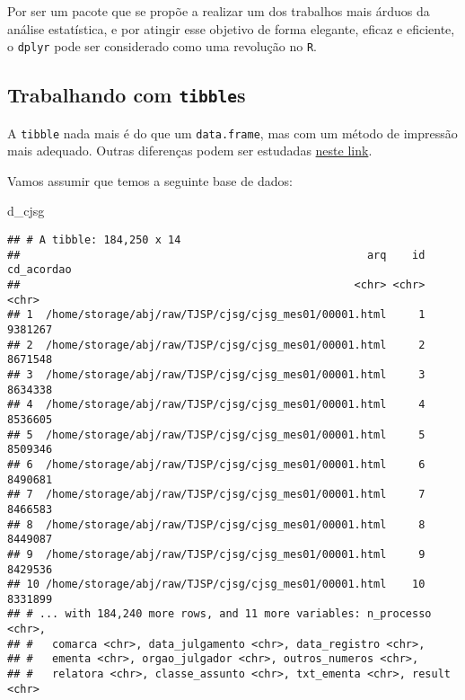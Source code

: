 \documentclass[]{book}
\newenvironment{Shaded}{\begin{snugshade}}{\end{snugshade}}
\newcommand{\NormalTok}[1]{{#1}}
\begin{document}
Por ser um pacote que se propõe a realizar um dos trabalhos mais árduos
da análise estatística, e por atingir esse objetivo de forma elegante,
eficaz e eficiente, o \texttt{dplyr} pode ser considerado como uma
revolução no \texttt{R}.

\subsection{\texorpdfstring{Trabalhando com
\texttt{tibble}s}{Trabalhando com tibbles}}\label{trabalhando-com-tibbles}

A \texttt{tibble} nada mais é do que um \texttt{data.frame}, mas com um
método de impressão mais adequado. Outras diferenças podem ser estudadas
\href{http://r4ds.had.co.nz/tibbles.html}{neste link}.

Vamos assumir que temos a seguinte base de dados:

\begin{Shaded}
\begin{Highlighting}[]
\NormalTok{d_cjsg}
\end{Highlighting}
\end{Shaded}

\begin{verbatim}
## # A tibble: 184,250 x 14
##                                                      arq    id cd_acordao
##                                                    <chr> <chr>      <chr>
## 1  /home/storage/abj/raw/TJSP/cjsg/cjsg_mes01/00001.html     1    9381267
## 2  /home/storage/abj/raw/TJSP/cjsg/cjsg_mes01/00001.html     2    8671548
## 3  /home/storage/abj/raw/TJSP/cjsg/cjsg_mes01/00001.html     3    8634338
## 4  /home/storage/abj/raw/TJSP/cjsg/cjsg_mes01/00001.html     4    8536605
## 5  /home/storage/abj/raw/TJSP/cjsg/cjsg_mes01/00001.html     5    8509346
## 6  /home/storage/abj/raw/TJSP/cjsg/cjsg_mes01/00001.html     6    8490681
## 7  /home/storage/abj/raw/TJSP/cjsg/cjsg_mes01/00001.html     7    8466583
## 8  /home/storage/abj/raw/TJSP/cjsg/cjsg_mes01/00001.html     8    8449087
## 9  /home/storage/abj/raw/TJSP/cjsg/cjsg_mes01/00001.html     9    8429536
## 10 /home/storage/abj/raw/TJSP/cjsg/cjsg_mes01/00001.html    10    8331899
## # ... with 184,240 more rows, and 11 more variables: n_processo <chr>,
## #   comarca <chr>, data_julgamento <chr>, data_registro <chr>,
## #   ementa <chr>, orgao_julgador <chr>, outros_numeros <chr>,
## #   relatora <chr>, classe_assunto <chr>, txt_ementa <chr>, result <chr>
\end{verbatim}
\end{document}

